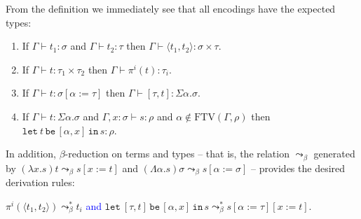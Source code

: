 \documentclass[a4paper,UKenglish,cleveref,autoref,numberwithinsect]{lipics-v2019}
\theoremstyle{definition}
\newcommand{\arrtype}{\rightarrow}
\newcommand{\subst}[2]{#1:=#2}
\newcommand{\abs}[2]{\lambda #1.#2}
\newcommand{\tabs}[2]{\Lambda #1.#2}
\newcommand{\pair}[2]{\langle #1,#2 \rangle}
\newcommand{\expair}[2]{[#1,#2]}
\newcommand{\FTV}{\mathrm{FTV}}
\newcommand{\proves}{\vdash}
\newcommand{\List}{\mathtt{List}}
\newcommand{\nil}{\mathtt{nil}}
\newcommand{\cons}{\mathtt{cons}}
\newcommand{\fold}{\mathtt{fold}}
\newcommand{\xlet}[4]{\mathtt{let}_{#1}\,#2\,\mathtt{be}\,[#3]\,\mathtt{in}\,#4}
\newcommand{\CKchange}[1]{\textcolor{blue}{#1}}
\begin{document}
From the definition we immediately see that all encodings have the expected types:

\begin{lemma}\label{lem:encodings_types}
  \begin{enumerate}
  \item If $\Gamma \proves t_1 : \sigma$ and $\Gamma \proves t_2 :
    \tau$ then $\Gamma \proves \pair{t_1}{t_2} : \sigma \times \tau$.
  \item If $\Gamma \proves t : \tau_1 \times \tau_2$ then $\Gamma
    \proves \pi^i(t) : \tau_i$.
  \item If $\Gamma \proves t : \sigma[\subst{\alpha}{\tau}]$ then
    $\Gamma \proves \expair{\tau}{t} : \Sigma \alpha . \sigma$.
  \item If $\Gamma \proves t : \Sigma \alpha . \sigma$ and
    $\Gamma,x:\sigma \proves s : \rho$ and $\alpha \notin
    \FTV(\Gamma,\rho)$ then $\xlet{}{t}{\alpha,x}{s} : \rho$.
  \end{enumerate}
\end{lemma}

In addition, $\beta$-reduction on terms and types -- that is, the
relation $\leadsto_\beta$ generated by $(\abs{x}{s})t \leadsto_\beta
s[x:=t]$ and $(\tabs{\alpha}{s})\sigma \leadsto_\beta
s[\alpha:=\sigma]$ -- provides the desired derivation rules:

\begin{lemma}\label{lem:encodings_reduce}
  $\pi^i(\pair{t_1}{t_2}) \leadsto_\beta^* t_i$
  \CKchange{and}
  $\xlet{}{\expair{\tau}{t}}{\alpha,x}{s} \leadsto_\beta^*
    s[\subst{\alpha}{\tau}][\subst{x}{t}]$.
\end{lemma}
\end{document}
